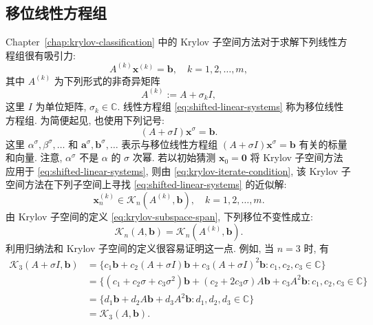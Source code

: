 \subsection{{移位线性方程组}}\label{sec:shifted-linear-systems}
{Chapter\ \ref{chap:krylov-classification} 中的 Krylov 子空间方法对于求解下列线性方程组很有吸引力:}
\begin{equation}\label{eq:shifted-linear-systems}A^{(k)}\bm x^{(k)}=\bm b,\quad k=1,2,\ldots,m,\end{equation}
{其中 $A^{(k)}$ 为下列形式的非奇异矩阵}
\begin{equation}\label{eq:shifted-coefficient-matrix}A^{(k)}:=A+\sigma_k I,\end{equation}
{这里 $I$ 为单位矩阵, $\sigma_k\in\mathbb C$. 线性方程组 \eqref{eq:shifted-linear-systems} 称为移位线性方程组. 为简便起见, 也使用下列记号:}
\[(A+\sigma I)\bm x^{\sigma}=\bm b.\]
{这里 $\alpha^{\sigma},\beta^{\sigma},\ldots$ 和 $\bm a^{\sigma},\bm b^{\sigma},\ldots$ 表示与移位线性方程组 $(A+\sigma I)\bm x^{\sigma}=\bm b$ 有关的标量和向量. 注意, $\alpha^{\sigma}$ 不是 $\alpha$ 的 $\sigma$ 次幂.}
{若以初始猜测 $\bm x_0=\bm0$ 将 Krylov 子空间方法应用于 \eqref{eq:shifted-linear-systems}, 则由 \eqref{eq:krylov-iterate-condition}, 该 Krylov 子空间方法在下列子空间上寻找 \eqref{eq:shifted-linear-systems} 的近似解:}
\begin{equation}\label{eq:shifted-krylov-membership}\bm x_n^{(k)}\in\mathcal K_n(A^{(k)},\bm b),\quad k=1,2,\ldots,m.\end{equation}
{由 Krylov 子空间的定义 \eqref{eq:krylov-subspace-span}, 下列移位不变性成立:}
\begin{equation}\label{eq:krylov-shift-invariance}\mathcal K_n(A,\bm b)=\mathcal K_n(A^{(k)},\bm b).\end{equation}
{利用归纳法和 Krylov 子空间的定义很容易证明这一点. 例如, 当 $n=3$ 时, 有}
\[\begin{aligned}\mathcal K_3(A+\sigma I,\bm b)&=\{c_1\bm b+c_2(A+\sigma I)\bm b+c_3(A+\sigma I)^2\bm b:c_1,c_2,c_3\in\mathbb C\}\\
&=\{(c_1+c_2\sigma+c_3\sigma^2)\bm b+(c_2+2c_3\sigma)A\bm b+c_3A^2\bm b:c_1,c_2,c_3\in\mathbb C\}\\
&=\{d_1\bm b+d_2A\bm b+d_3A^2\bm b:d_1,d_2,d_3\in\mathbb C\}\\
&=\mathcal K_3(A,\bm b).\end{aligned}\]
